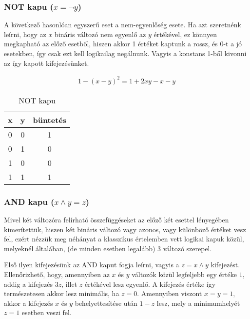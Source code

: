 \subsubsection{NOT kapu ($x= \neg y$)}

A következő hasonlóan egyszerű eset a nem-egyenlőség esete. Ha azt szeretnénk leírni, hogy az $x$ bináris változó nem egyenlő az $y$ értékével, ez könnyen megkapható az előző esetből, hiszen akkor 1 értéket kaptunk a rossz, és 0-t a jó esetekben, így csak ezt kell logikailag negálnunk. Vagyis a konstans 1-ből kivonni az így kapott kifejezésünket.



\begin{align}
	1-(x-y)^2=1+2xy-x-y
\end{align}

\begin{table}[ht]
	\footnotesize
	\centering
	\begin{tabular}{ c c c }
		\toprule
		x & y & büntetés \\
		\midrule
		0 & 0 & 1 \\
		0 & 1 & 0 \\
		1 & 0 & 0 \\
		1 & 1 & 1 \\		
		\bottomrule
	\end{tabular}
	\caption{NOT kapu}
	\label{tab:NOTgate}
\end{table}



\subsubsection{AND kapu ($x \wedge y = z$)}

Mivel két változóra felírható összefüggéseket az előző két esettel lényegében kimerítettük, hiszen két bináris változó vagy azonos, vagy különböző értéket vesz fel, ezért nézzük meg néhányat a klasszikus értelemben vett logikai kapuk közül, melyeknél általában, (de minden esetben legalább) 3 változó szerepel.


Első ilyen kifejezésünk az AND kaput fogja leírni, vagyis a $z=x \wedge y$ kifejezést. Ellenőrizhető, hogy, amennyiben az $x$ és $y$ változók közül legfeljebb egy értéke $1$, addig a kifejezés $3z$, illet $z$ értékével lesz egyenlő. A kifejezés értéke így természetesen akkor lesz minimális, ha $z=0$. Amennyiben viszont $x=y=1$, akkor a kifejezés $x$ és $y$ behelyettesítése után $1-z$ lesz, mely a minimumhelyét $z=1$ esetben veszi fel.

